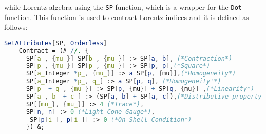 \documentclass[main.tex]{subfiles}
\begin{document}
while Lorentz algebra using the \texttt{SP} function, which is a wrapper for the \texttt{Dot} function. This 
function is used to contract Lorentz indices and it is defined as follows:

\begin{lstlisting}[language=Mathematica,caption = {Lorentz algebra}, label = {lst:lorentz-algebra}]
    SetAttributes[SP, Orderless]
    Contract = (# //. {
      SP[a_, {mu_}] SP[b_, {mu_}] :> SP[a, b], (*Contraction*)
      SP[p_, {mu_}] SP[p_, {mu_}] :> SP[p, p],(*Square*)
      SP[a_Integer *p_, {mu_}] :> a SP[p, {mu}],(*Homogeneity*)
      SP[a_Integer *p_, q_] :> a SP[p, q], (*Homogeneity'*)
      SP[p_ + q_, {mu_}] :> SP[p, {mu}] + SP[q, {mu}] ,(*Linearity*)
      SP[a_, b_ + c_] :> (SP[a, b] + SP[a, c]),(*Distributive property'*)
      SP[{mu_}, {mu_}] :> 4 (*Trace*),
      SP[n, n] :> 0 (*Light Cone Gauge*),
       SP[p[i_], p[i_]] :> 0 (*On Shell Condition*)
      }) &;
\end{lstlisting}
\end{document}
